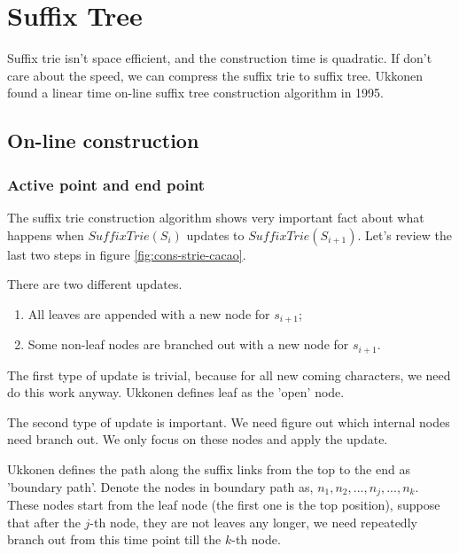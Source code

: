 \documentclass{article}
\begin{document}
\section{Suffix Tree}

Suffix trie isn't space efficient, and the construction time
is quadratic. If don't care about the speed, we can compress the
suffix trie to suffix tree\cite{trivial-stree-java}. Ukkonen
found a linear time on-line suffix tree construction algorithm
in 1995.

\subsection{On-line construction}

\subsubsection{Active point and end point}
\label{ap-and-ep}

The suffix trie construction algorithm shows very
important fact about what happens when $SuffixTrie(S_i)$ updates to
$SuffixTrie(S_{i+1})$. Let's review the last two steps in figure
\ref{fig:cons-strie-cacao}.

There are two different updates.
\begin{enumerate}
\item All leaves are appended with a new node for $s_{i+1}$;
\item Some non-leaf nodes are branched out with a new node for $s_{i+1}$.
\end{enumerate}

The first type of update is trivial, because for all new coming characters,
we need do this work anyway. Ukkonen defines leaf as the 'open' node.

The second type of update is important. We need figure out which internal
nodes need branch out. We only focus on these nodes and apply the
update.

Ukkonen defines the path along the suffix links from the top to the end
as 'boundary path'.
Denote the nodes in boundary path  as, $n_1, n_2, ..., n_j, ..., n_k$.
These nodes start from the leaf node (the first one is the top position),
suppose that after the $j$-th node, they are not leaves any longer,
we need repeatedly branch out from this time point till the $k$-th node.
\end{document}
